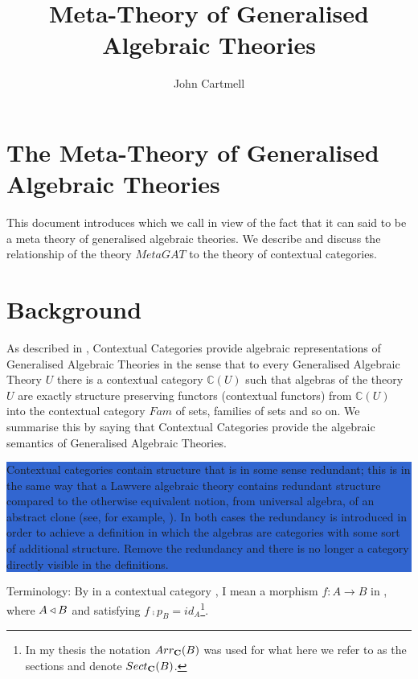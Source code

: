 \documentclass[10pt,a4paper]{article}
\title{Meta-Theory of Generalised Algebraic Theories}
\author{John Cartmell}
\newcommand{\highlightpara}[1]{\colorbox{highlight}{%
    \parbox{\dimexpr\linewidth-2\fboxsep}%
        {#1}}
}
\begin{document}
\maketitle

\section{The Meta-Theory of Generalised Algebraic Theories}
This document introduces     
which we call  in view of the fact that it can said to be a meta theory of generalised algebraic theories. We describe and discuss the relationship of the theory $MetaGAT$ to the theory of contextual categories.  

\section{Background}
As described in \cite{Cartmell86}, Contextual Categories provide algebraic representations of Generalised Algebraic Theories  in the sense that to every Generalised Algebraic Theory $U$ there is a contextual category $\mathbb{C}(U)$ such that algebras of the theory $U$ are exactly structure preserving functors (contextual functors)  from $\mathbb{C}(U)$ into the contextual category $Fam$ of sets, families of sets and so on. We summarise this by saying that Contextual Categories provide the algebraic semantics of Generalised Algebraic Theories. 

\noindent
\highlightpara{Contextual categories contain structure that is in some sense redundant; this is in the same way that a Lawvere algebraic theory contains redundant structure compared to the otherwise equivalent notion, from universal algebra, of an abstract clone (see, for example, \cite{KerkoffonClones}). In both cases the redundancy is introduced in order to achieve a definition in which the algebras are categories with some sort of additional structure. Remove the redundancy and there is no longer a category directly visible in the definitions.}

Terminology: By 
 in a contextual category \catc, I mean a morphism $f:A\rightarrow B$ in \catc, where 
$A \triangleleft B$ and satisfying  $f \comp p_B = id_A$\footnote{In my thesis the notation $Arr_{\textbf{C}}(B)$ was used for what here we refer to as the sections and denote $Sect_{\textbf{C}}(B)$.}.
\end{document}
